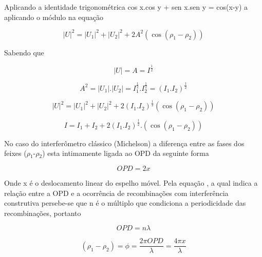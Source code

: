 \documentclass[oneside,openright,12pt]{ufsm_2021} %
\begin{document}
    Aplicando a identidade trigonométrica cos x.cos y + sen x.sen y = cos(x-y) a aplicando o módulo na equação

    \begin{equation}
        |U|^2 = |U_1|^2 + |U_2|^2 + 2A^2(\cos(\rho_1-\rho_2))
    \end{equation}

    \par Sabendo que 

    \begin{equation}
        |U| = A = I^{\frac{1}{2}}     
    \end{equation}

    \begin{equation}
        A^2 = |U_1|.|U_2| = I_1^{\frac{1}{2}}.I_2^{\frac{1}{2}} = (I_1.I_2)^{\frac{1}{2}}   
    \end{equation}

    \begin{equation}
        |U|^2 = |U_1|^2 + |U_2|^2 + 2(I_1.I_2)^{\frac{1}{2}}(\cos(\rho_1-\rho_2))     
    \end{equation}

    \begin{equation}
        I = I_1 + I_2 + 2(I_1.I_2)^{\frac{1}{2}}.(\cos(\rho_1-\rho_2))
    \end{equation}

    \par No caso do interferômetro clássico (Michelson) a diferença entre as fases dos feixes ($\rho$$_1$-$\rho$$_2$) esta intimamente ligada ao OPD da seguinte forma

    \begin{equation}
        OPD = 2x
    \end{equation}

    \par Onde x é o deslocamento linear do espelho móvel. Pela equação \cite{Eq?}, a qual indica a relação entre a OPD e a ocorrência de recombinações com interferência construtiva persebe-se que n é o múltiplo que condiciona a periodicidade das recombinações, portanto

    \begin{equation}
        OPD = n\lambda
    \end{equation}

    \begin{equation}
        (\rho_1-\rho_2) = \phi = \frac{2\pi OPD}{\lambda} = \frac{4\pi x}{\lambda}
    \end{equation}
\end{document}
